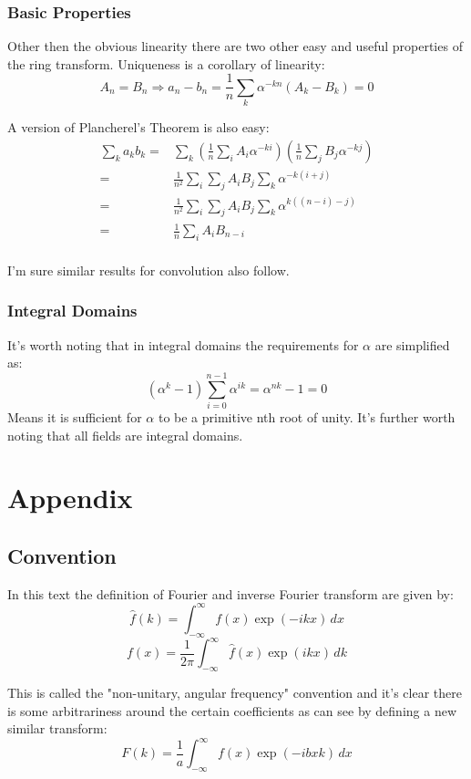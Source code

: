 \documentclass[12pt]{report}
\begin{document}
\subsection{Basic Properties}
Other then the obvious linearity there are two other easy and useful properties of the ring transform.
Uniqueness is a corollary of linearity:
\[A_n=B_n \Rightarrow a_n-b_n = \frac{1}{n}\sum_k\alpha^{-kn}(A_k-B_k) = 0\]

A version of Plancherel's Theorem is also easy:
\begin{equation*}
\begin{aligned}
	\sum_k a_kb_k =& \sum_k \left(\frac{1}{n}\sum_iA_i\alpha^{-ki}\right) \left(\frac{1}{n}\sum_jB_j\alpha^{-kj}\right) \\
	=&  \frac{1}{n^2}\sum_i\sum_jA_iB_j \sum_k\alpha^{-k(i+j)}  \\
	=&  \frac{1}{n^2}\sum_i\sum_jA_iB_j \sum_k\alpha^{k((n-i)-j)}  \\
	=&  \frac{1}{n}\sum_iA_iB_{n-i}  \\
\end{aligned}
\end{equation*}

I'm sure similar results for convolution also follow.

\subsection{Integral Domains}
It's worth noting that in integral domains the requirements for $\alpha$ are simplified as:
\[(\alpha^k-1)\sum_{i=0}^{n-1}\alpha^{ik} = \alpha^{nk}-1 = 0\]
Means it is sufficient for $\alpha$ to be a primitive nth root of unity.
It's further worth noting that all fields are integral domains.

\appendix	
\chapter{Appendix}

\section{Convention}
In this text the definition of Fourier and inverse Fourier transform are given by:
\[\hat{f}(k) = \int_{-\infty}^{\infty}f(x)\exp(-ikx)\,dx\]
\[f(x) =\frac{1}{2\pi} \int_{-\infty}^{\infty}\hat{f}(x)\exp(ikx)\,dk\]

This is called the "non-unitary, angular frequency" convention and it's clear there is some arbitrariness around the certain coefficients as can see by defining a new similar transform:
\[F(k) = \frac{1}{a}\int_{-\infty}^{\infty}f(x)\exp(-ibxk)\,dx\]
\end{document}
